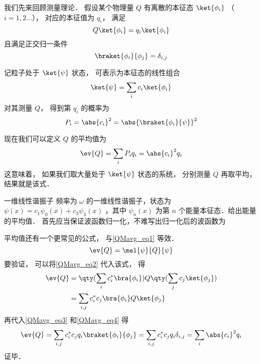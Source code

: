 

我们先来回顾测量理论． 假设某个物理量 $Q$ 有离散的本征态 $\ket{\phi_i}$ （$i = 1,2\dots$）， 对应的本征值为 $q_i$， 满足
\begin{equation}\label{QMavg_eq3}
Q\ket{\phi_i} = q_i \ket{\phi_i}
\end{equation}
且满足正交归一条件
\begin{equation}\label{QMavg_eq4}
\braket{\phi_i}{\phi_j} = \delta_{i,j}
\end{equation}

记粒子处于 $\ket{\psi}$ 状态， 可表示为本征态的线性组合
\begin{equation}\label{QMavg_eq2}
\ket{\psi} = \sum_i c_i \ket{\phi_i}
\end{equation}
对其测量 $Q$， 得到第 $q_i$ 的概率为
\begin{equation}
P_i = \abs{c_i}^2 = \abs{\braket{\phi_i}{\psi}}^2
\end{equation}

现在我们可以定义 $Q$ 的平均值为
\begin{equation}\label{QMavg_eq1}
\ev{Q} = \sum_i P_i q_i = \abs{c_i}^2 q_i
\end{equation}
这意味着， 如果我们取大量处于 $\ket{\psi}$ 状态的系统， 分别测量 $Q$ 再取平均， 结果就是该式．

\begin{example}{一维线性谐振子}
频率为 $\omega$ 的一维线性谐振子，状态为 $\psi(x)=c_1 \psi_0(x)+c_3\psi_3(x)$ ，其中 $\psi_n(x)$ 为第 $n$ 个能量本征态．给出能量的平均值．
首先应当保证波函数归一化，不难写出归一化后的波函数为
\begin{equation}

\end{equation}
\end{example}

平均值还有一个更常见的公式， 与\autoref{QMavg_eq1} 等效．
\begin{equation}\label{QMavg_eq5}
\ev{Q} = \mel{\psi}{Q}{\psi}
\end{equation}
要验证， 可以将\autoref{QMavg_eq2} 代入该式， 得
\begin{equation}
\begin{aligned}
\ev{Q} &= \qty(\sum_i c_i^* \bra{\phi_i}) Q \qty(\sum_j c_j \ket{\phi_j})\\
&= \sum_{i,j} c_i^* c_j \bra{\phi_i} Q \ket{\phi_j}
\end{aligned} 
\end{equation}
再代入\autoref{QMavg_eq3} 和\autoref{QMavg_eq4} 得
\begin{equation}
\ev{Q} = \sum_{i,j} c_i^* c_j q_i \braket{\phi_i}{\phi_j}
= \sum_{i,j} c_i^* c_j q_i \delta_{i,j} = \sum_i \abs{c_i}^2 q_i
\end{equation}
证毕．







